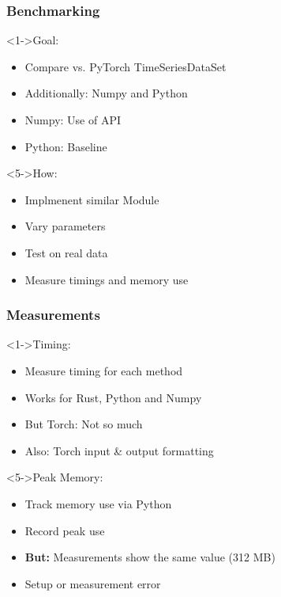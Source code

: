 \documentclass[t,english]{beamer}
\begin{document}

\begin{frame}
  \frametitle{Benchmarking}
  \begin{block}<1->{Goal:}
    \begin{itemize}
      \item<1-> Compare vs. PyTorch TimeSeriesDataSet
      \item<2-> Additionally: Numpy and Python
      \item <3-> Numpy: Use of API
      \item <4-> Python: Baseline
    \end{itemize}
  \end{block}

  \begin{block}<5->{How:}
    \begin{itemize}
      \item<5-> Implmenent similar Module
      \item<6-> Vary parameters
      \item <7-> Test on real data
      \item <8-> Measure timings and memory use
    \end{itemize}
  \end{block}
\end{frame}

\begin{frame}
  \frametitle{Measurements}
  \begin{block}<1->{Timing:}
    \begin{itemize}
      \item<1-> Measure timing for each method
      \item<2-> Works for Rust, Python and Numpy
      \item <3-> But Torch: Not so much
      \item <4-> Also: Torch input \& output formatting
    \end{itemize}
  \end{block}

  \begin{block}<5->{Peak Memory:}
    \begin{itemize}
      \item<5-> Track memory use via Python
      \item <6-> Record peak use
      \item <7-> \textbf{But:} Measurements show the same value (312 MB)
      \item <8-> Setup or measurement error
    \end{itemize}
  \end{block}
\end{frame}
\end{document}
